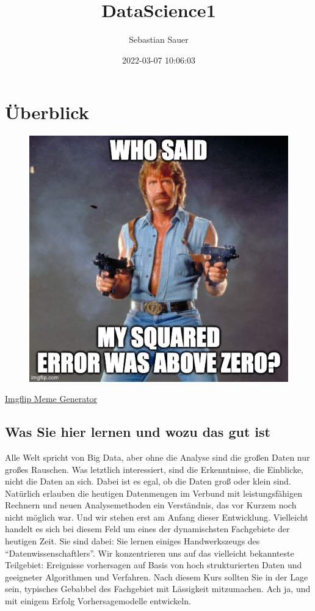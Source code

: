 \documentclass[
]{book}
\title{DataScience1}
\author{Sebastian Sauer}
\date{2022-03-07 10:06:03}
\begin{document}
\maketitle

{
\setcounter{tocdepth}{1}
\tableofcontents
}
\hypertarget{uxfcberblick}{%
\chapter{Überblick}\label{uxfcberblick}}

\begin{figure}[H]

{\centering \includegraphics[width=0.5\linewidth]{img/662upp} 

}

\end{figure}

\href{https://imgflip.com/i/662upp}{Imgflip Meme Generator}

\hypertarget{was-sie-hier-lernen-und-wozu-das-gut-ist}{%
\section{Was Sie hier lernen und wozu das gut ist}\label{was-sie-hier-lernen-und-wozu-das-gut-ist}}

Alle Welt spricht von Big Data, aber ohne die Analyse sind die großen Daten nur großes Rauschen. Was letztlich interessiert, sind die Erkenntnisse, die Einblicke, nicht die Daten an sich.
Dabei ist es egal, ob die Daten groß oder klein sind.
Natürlich erlauben die heutigen Datenmengen im Verbund mit leistungsfähigen Rechnern und neuen Analysemethoden ein Verständnis,
das vor Kurzem noch nicht möglich war.
Und wir stehen erst am Anfang dieser Entwicklung.
Vielleicht handelt es sich bei diesem Feld um eines der dynamischsten Fachgebiete der heutigen Zeit.
Sie sind dabei: Sie lernen einiges Handwerkszeugs des ``Datenwissenschaftlers''.
Wir konzentrieren uns auf das vielleicht bekannteste Teilgebiet:
Ereignisse vorhersagen auf Basis von hoch strukturierten Daten
und geeigneter Algorithmen und Verfahren.
Nach diesem Kurs sollten Sie in der Lage sein,
typisches Gebabbel des Fachgebiet mit Lässigkeit mitzumachen.
Ach ja, und mit einigem Erfolg Vorhersagemodelle entwickeln.
\end{document}

